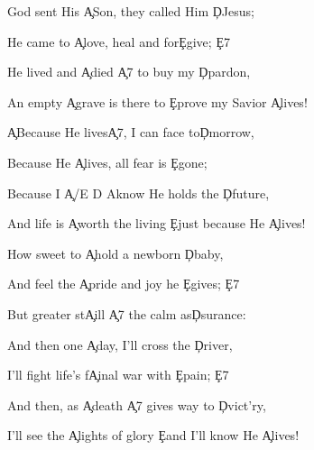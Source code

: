 \documentclass[9pt]{extarticle}
\begin{document}
\bsong

\bv
God sent His \c{A}Son, they called Him \c{D}Jesus;

He came to \c{A}love, heal and for\c{E}give; \c{E7}

He lived and \c{A}died \c{A7} to buy my \c{D}pardon,

An empty \c{A}grave is there to \c{E}prove my Savior \c{A}lives!
\ev

\bc
\c{A}Because He lives\c{A7}, I can face to\c{D}morrow,

Because He \c{A}lives, all fear is \c{E}gone;

Because I \c{A/E D A}know He holds the \c{D}future,

And life is \c{A}worth the living \c{E}just because He \c{A}lives!
\ec

\bv
How sweet to \c{A}hold a newborn \c{D}baby,

And feel the \c{A}pride and joy he \c{E}gives; \c{E7}

But greater st\c{A}ill \c{A7} the calm as\c{D}surance:

\ev


\bv
And then one \c{A}day, I'll cross the \c{D}river,

I'll fight life's f\c{A}inal war with \c{E}pain; \c{E7}

And then, as \c{A}death \c{A7} gives way to \c{D}vict'ry,

I'll see the \c{A}lights of glory \c{E}and I'll know He \c{A}lives!
\ev


\esong
\end{document}
